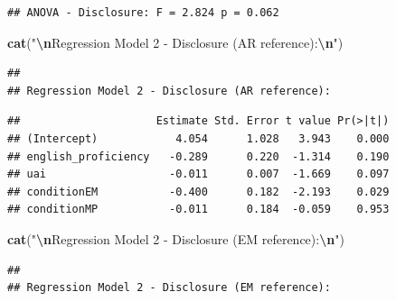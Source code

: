\documentclass[
]{article}
\newenvironment{Shaded}{\begin{snugshade}}{\end{snugshade}}
\newcommand{\DecValTok}[1]{\textcolor[rgb]{0.00,0.00,0.81}{#1}}
\newcommand{\FunctionTok}[1]{\textcolor[rgb]{0.13,0.29,0.53}{\textbf{#1}}}
\newcommand{\NormalTok}[1]{#1}
\newcommand{\SpecialCharTok}[1]{\textcolor[rgb]{0.81,0.36,0.00}{\textbf{#1}}}
\newcommand{\StringTok}[1]{\textcolor[rgb]{0.31,0.60,0.02}{#1}}
\begin{document}
\begin{verbatim}
## ANOVA - Disclosure: F = 2.824 p = 0.062
\end{verbatim}

\begin{Shaded}
\begin{Highlighting}[]
\FunctionTok{cat}\NormalTok{(}\StringTok{"}\SpecialCharTok{\textbackslash{}n}\StringTok{Regression Model 2 {-} Disclosure (AR reference):}\SpecialCharTok{\textbackslash{}n}\StringTok{"}\NormalTok{)}
\end{Highlighting}
\end{Shaded}

\begin{verbatim}
## 
## Regression Model 2 - Disclosure (AR reference):
\end{verbatim}

\begin{Shaded}
\end{Shaded}

\begin{verbatim}
##                     Estimate Std. Error t value Pr(>|t|)
## (Intercept)            4.054      1.028   3.943    0.000
## english_proficiency   -0.289      0.220  -1.314    0.190
## uai                   -0.011      0.007  -1.669    0.097
## conditionEM           -0.400      0.182  -2.193    0.029
## conditionMP           -0.011      0.184  -0.059    0.953
\end{verbatim}

\begin{Shaded}
\begin{Highlighting}[]
\FunctionTok{cat}\NormalTok{(}\StringTok{"}\SpecialCharTok{\textbackslash{}n}\StringTok{Regression Model 2 {-} Disclosure (EM reference):}\SpecialCharTok{\textbackslash{}n}\StringTok{"}\NormalTok{)}
\end{Highlighting}
\end{Shaded}

\begin{verbatim}
## 
## Regression Model 2 - Disclosure (EM reference):
\end{verbatim}

\begin{Shaded}
\end{Shaded}
\end{document}
